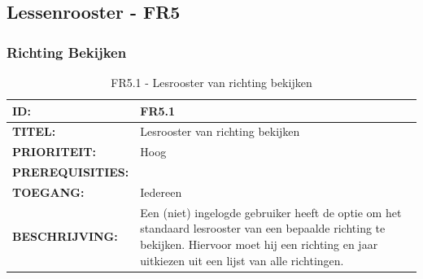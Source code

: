\subsection{Lessenrooster - FR5}

\subsubsection{Richting Bekijken}   
\noindent\begin{table}[H]
            \begin{tabular}{l | p{10cm}}
                \textbf{ID:} & FR5.1 \\ \hline
                \textbf{TITEL:} & Lesrooster van richting bekijken \\ \hline
                \textbf{PRIORITEIT:} &  Hoog \\ \hline
                \textbf{PREREQUISITIES:} & \\ \hline
                \textbf{TOEGANG:} &  Iedereen \\ \hline
                \textbf{BESCHRIJVING:} & Een (niet) ingelogde gebruiker heeft de optie om het standaard lesrooster van een bepaalde richting te bekijken. Hiervoor moet hij een richting en jaar uitkiezen uit een lijst van alle richtingen.\\
            \end{tabular}\\
            \caption{FR5.1 - Lesrooster van richting bekijken}
            \label{tab:FR5.1 - Lesrooster van richting bekijken}
        \end{table}

